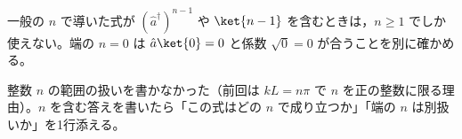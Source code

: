 \item 一般の $n$ で導いた式が $(\hat{a}^{\dagger})^{n-1}$ や $\ket{n-1}$ を含むときは，$n\ge1$ でしか使えない。端の $n=0$ は $\hat{a}\ket{0}=0$ と係数 $\sqrt{0}=0$ が合うことを別に確かめる。
\item {} 整数 $n$ の範囲の扱いを書かなかった（前回は $kL=n\pi$ で $n$ を正の整数に限る理由）。$n$ を含む答えを書いたら「この式はどの $n$ で成り立つか」「端の $n$ は別扱いか」を1行添える。
